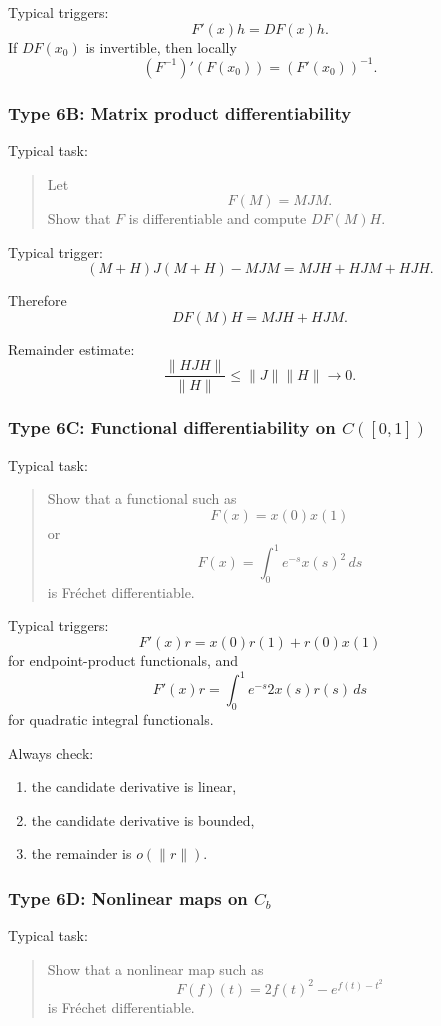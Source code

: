 Typical triggers:
\[
    F'(x)h=DF(x)h.
\]
If $DF(x_0)$ is invertible, then locally
\[
    (F^{-1})'(F(x_0)) = (F'(x_0))^{-1}.
\]

\subsubsection*{Type 6B: Matrix product differentiability}

Typical task:
\begin{quote}
    Let
    \[
        F(M)=MJM.
    \]
    Show that $F$ is differentiable and compute $DF(M)H$.
\end{quote}

Typical trigger:
\[
    (M+H)J(M+H)-MJM
    =
    MJH+HJM+HJH.
\]

Therefore
\[
    DF(M)H=MJH+HJM.
\]

Remainder estimate:
\[
    \frac{\|HJH\|}{\|H\|}
    \leq
    \|J\|\|H\|\to 0.
\]

\subsubsection*{Type 6C: Functional differentiability on $C([0,1])$}

Typical task:
\begin{quote}
    Show that a functional such as
    \[
        F(x)=x(0)x(1)
    \]
    or
    \[
        F(x)=\int_0^1 e^{-s}x(s)^2\,ds
    \]
    is Fréchet differentiable.
\end{quote}

Typical triggers:
\[
    F'(x)r=x(0)r(1)+r(0)x(1)
\]
for endpoint-product functionals, and
\[
    F'(x)r=\int_0^1 e^{-s}2x(s)r(s)\,ds
\]
for quadratic integral functionals.

Always check:
\begin{enumerate}
    \item the candidate derivative is linear,
    \item the candidate derivative is bounded,
    \item the remainder is $o(\|r\|)$.
\end{enumerate}

\subsubsection*{Type 6D: Nonlinear maps on $C_b$}

Typical task:
\begin{quote}
    Show that a nonlinear map such as
    \[
        F(f)(t)=2f(t)^2-e^{f(t)-t^2}
    \]
    is Fréchet differentiable.
\end{quote}

